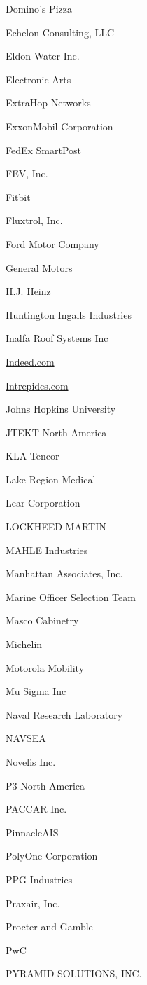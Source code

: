 \documentclass[twoside]{article}
\begin{document}
\begin{center}
\begin{multicols}{5}
\begin{FlushLeft}
\begin{compactitem}
\item Domino's Pizza
\item Echelon Consulting, LLC
\item Eldon Water Inc.
\item Electronic Arts
\item ExtraHop Networks
\item ExxonMobil Corporation
\item FedEx SmartPost
\item FEV, Inc.
\item Fitbit
\item Fluxtrol, Inc.
\item Ford Motor Company
\item General Motors
\item H.J. Heinz
\item Huntington Ingalls Industries
\item Inalfa Roof Systems Inc
\item \url{Indeed.com}
\item \url{Intrepidcs.com}
\item Johns Hopkins University
\item JTEKT North America
\item KLA-Tencor
\item Lake Region Medical
\item Lear Corporation
\item LOCKHEED MARTIN
\item MAHLE Industries
\item Manhattan Associates, Inc.
\item Marine Officer Selection Team
\item Masco Cabinetry
\item Michelin
\item Motorola Mobility
\item Mu Sigma Inc
\item Naval Research Laboratory
\item NAVSEA
\item Novelis Inc.
\item P3 North America
\item PACCAR Inc.
\item PinnacleAIS
\item PolyOne Corporation
\item PPG Industries
\item Praxair, Inc.
\item Procter and Gamble
\item PwC
\item PYRAMID SOLUTIONS, INC.

\end{compactitem}
\end{FlushLeft}
\end{multicols}
\end{center}
\end{document}

